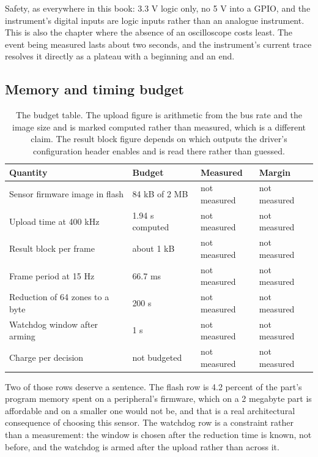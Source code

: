 Safety, as everywhere in this book: 3.3 V logic only, no 5 V into a GPIO, and
the instrument's digital inputs are logic inputs rather than an analogue
instrument. This is also the chapter where the absence of an oscilloscope costs
least. The event being measured lasts about two seconds, and the instrument's
current trace resolves it directly as a plateau with a beginning and an end.

\subsection*{Memory and timing budget}


\begin{table}[H]\centering\small
\begin{tabular}{p{44mm}p{28mm}p{28mm}p{30mm}}
\toprule
Quantity & Budget & Measured & Margin \\
\midrule
Sensor firmware image in flash & 84 kB of 2 MB & not measured & not measured \\
Upload time at 400 kHz & 1.94 s computed & not measured & not measured \\
Result block per frame & about 1 kB & not measured & not measured \\
Frame period at 15 Hz & 66.7 ms & not measured & not measured \\
Reduction of 64 zones to a byte & 200 \textmu{}s & not measured & not measured \\
Watchdog window after arming & 1 s & not measured & not measured \\
Charge per decision & not budgeted & not measured & not measured \\
\bottomrule
\end{tabular}
\caption{The budget table. The upload figure is arithmetic from the bus rate and the image size and is marked computed rather than measured, which is a different claim. The result block figure depends on which outputs the driver's configuration header enables and is read there rather than guessed.}
\end{table}

Two of those rows deserve a sentence. The flash row is 4.2 percent of the
part's program memory spent on a peripheral's firmware, which on a 2 megabyte
part is affordable and on a smaller one would not be, and that is a real
architectural consequence of choosing this sensor. The watchdog row is a
constraint rather than a measurement: the window is chosen after the reduction
time is known, not before, and the watchdog is armed after the upload rather
than across it.

